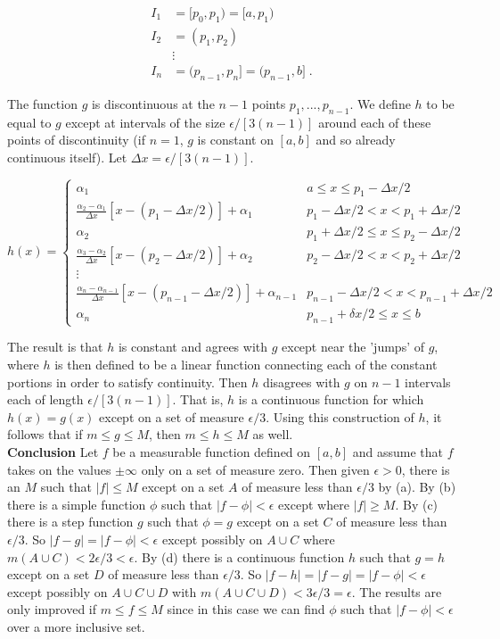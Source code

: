 \documentclass[a4paper]{article}
\begin{document}
\begin{align*}
I_1 &= [p_0, p_1) = [a,p_1) \\
I_2 &= (p_1, p_2) \\
&\vdots \\
I_n &= (p_{n-1}, p_n] = (p_{n-1}, b] \;.
\end{align*}

The function $g$ is discontinuous at the $n-1$ points $p_1, ..., p_{n-1}$. We define $h$ to be equal to $g$ except at intervals of the size $\epsilon / [3(n-1)]$ around each of these points of discontinuity (if $n = 1$, $g$ is constant on $[a,b]$ and so already continuous itself). Let $\Delta x = \epsilon / [3(n-1)]$. 

$$h(x) = \begin{cases}
\alpha_1 &  a\leq x \leq p_1 - \Delta x / 2 \\
\frac{\alpha_2 - \alpha_1}{\Delta x}[x - (p_1 - \Delta x / 2)] + \alpha_1 & p_1 - \Delta x / 2 < x < p_1 + \Delta x / 2 \\
\alpha_2 & p_1 + \Delta x / 2 \leq x \leq p_2 - \Delta x /2 \\
\frac{\alpha_3 - \alpha_2}{\Delta x}[x - (p_2 - \Delta x / 2)] + \alpha_2 & p_2 - \Delta x / 2 < x < p_2 + \Delta x / 2 \\
\vdots \\
\frac{\alpha_n - \alpha_{n-1}}{\Delta x}[x - (p_{n-1} - \Delta x / 2)] + \alpha_{n-1} & p_{n-1} - \Delta x / 2 < x < p_{n-1} + \Delta x / 2 \\
\alpha_n & p_{n-1} + \delta x / 2 \leq x \leq b
\end{cases}$$

The result is that $h$ is constant and agrees with $g$ except near the 'jumps' of $g$, where $h$ is then defined to be a linear function connecting each of the constant portions in order to satisfy continuity. Then $h$ disagrees with $g$ on $n-1$ intervals each of length $\epsilon / [3(n-1)]$. That is, $h$ is a continuous function for which $h(x) = g(x)$ except on a set of measure $\epsilon/3$. Using this construction of $h$, it follows that if $m\leq g \leq M$, then $m\leq h \leq M$ as well. \\

{\bf Conclusion} Let $f$ be a measurable function defined on $[a,b]$ and assume that $f$ takes on the values $\pm \infty$ only on a set of measure zero. Then given $\epsilon > 0$, there is an $M$ such that $|f| \leq M$ except on a set $A$ of measure less than $\epsilon / 3$ by (a). By (b) there is a simple function $\phi$ such that $|f - \phi| < \epsilon$ except where $|f| \geq M$. By (c) there is a step function $g$ such that $\phi = g$ except on a set $C$ of measure less than $\epsilon / 3$. So $|f - g| = |f-\phi| < \epsilon$ except possibly on $A\cup C$ where $m(A\cup C) < 2\epsilon / 3 < \epsilon$. By (d) there is a continuous function $h$ such that $g = h$ except on a set $D$ of measure less than $\epsilon / 3$. So $|f - h| = |f-g| = |f-\phi | < \epsilon$ except possibly on $A\cup C \cup D$ with $m(A\cup C \cup D) < 3 \epsilon / 3 = \epsilon$. The results are only improved if $m \leq f \leq M$ since in this case we can find $\phi$ such that $|f - \phi| < \epsilon$ over a more inclusive set. 
\end{document}
